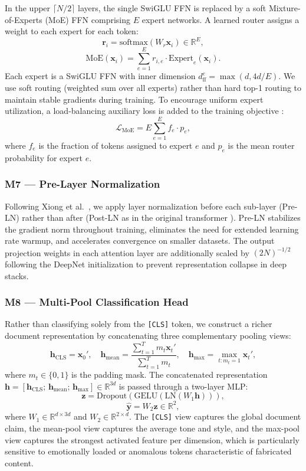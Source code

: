 \documentclass[conference]{IEEEtran}
\begin{document}
In the upper $\lceil N/2 \rceil$ layers, the single SwiGLU FFN is replaced by a soft Mixture-of-Experts (MoE) FFN \cite{fedus2022switch} comprising $E$ expert networks. A learned router assigns a weight to each expert for each token:
\[
\mathbf{r}_i = \text{softmax}(W_r \mathbf{x}_i) \in \mathbb{R}^E,
\]
\[
\text{MoE}(\mathbf{x}_i) = \sum_{e=1}^{E} r_{i,e} \cdot \text{Expert}_e(\mathbf{x}_i).
\]
Each expert is a SwiGLU FFN with inner dimension $d_{\text{ff}}^e = \max(d, 4d/E)$. We use soft routing (weighted sum over all experts) rather than hard top-1 routing to maintain stable gradients during training. To encourage uniform expert utilization, a load-balancing auxiliary loss is added to the training objective \cite{fedus2022switch}:
\[
\mathcal{L}_{\text{MoE}} = E \sum_{e=1}^{E} f_e \cdot p_e,
\]
where $f_e$ is the fraction of tokens assigned to expert $e$ and $p_e$ is the mean router probability for expert $e$.

\subsubsection{M7 — Pre-Layer Normalization}

Following Xiong et al.\ \cite{xiong2020layer}, we apply layer normalization before each sub-layer (Pre-LN) rather than after (Post-LN as in the original transformer \cite{vaswani2017attention}). Pre-LN stabilizes the gradient norm throughout training, eliminates the need for extended learning rate warmup, and accelerates convergence on smaller datasets. The output projection weights in each attention layer are additionally scaled by $(2N)^{-1/2}$ following the DeepNet initialization \cite{wang2022deepnet} to prevent representation collapse in deep stacks.

\subsubsection{M8 — Multi-Pool Classification Head}

Rather than classifying solely from the \texttt{[CLS]} token, we construct a richer document representation by concatenating three complementary pooling views:
\[
\mathbf{h}_{\text{CLS}} = \mathbf{x}_0', \quad
\mathbf{h}_{\text{mean}} = \frac{\sum_{t=1}^{T} m_t \mathbf{x}_t'}{\sum_{t=1}^{T} m_t}, \quad
\mathbf{h}_{\text{max}} = \max_{t: m_t=1} \mathbf{x}_t',
\]
where $m_t \in \{0,1\}$ is the padding mask. The concatenated representation $\mathbf{h} = [\mathbf{h}_{\text{CLS}};\, \mathbf{h}_{\text{mean}};\, \mathbf{h}_{\text{max}}] \in \mathbb{R}^{3d}$ is passed through a two-layer MLP:
\[
\mathbf{z} = \text{Dropout}(\text{GELU}(\text{LN}(W_1 \mathbf{h}))),
\]
\[
\hat{\mathbf{y}} = W_2 \mathbf{z} \in \mathbb{R}^2,
\]
where $W_1 \in \mathbb{R}^{d \times 3d}$ and $W_2 \in \mathbb{R}^{2 \times d}$. The \texttt{[CLS]} view captures the global document claim, the mean-pool view captures the average tone and style, and the max-pool view captures the strongest activated feature per dimension, which is particularly sensitive to emotionally loaded or anomalous tokens characteristic of fabricated content.
\end{document}
